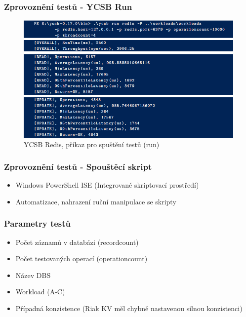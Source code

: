\documentclass{beamer}
\begin{document}
	\begin{frame}
		\frametitle{Zprovoznění testů - YCSB Run}
		\begin{figure}
			\centering
			\includegraphics[scale=0.53]{Figures/ycsb_run_cut.PNG}
			\caption{YCSB Redis, příkaz pro spuštění testů (run)}
		\end{figure}
	\end{frame}
	
	\begin{frame}
		\frametitle{Zprovoznění testů - Spouštěcí skript}
		\begin{itemize}
			\item Windows PowerShell ISE (Integrované skriptovací prostředí)
			\item Automatizace, nahrazení ruční manipulace se skripty
		\end{itemize}
	\end{frame}
	
	\begin{frame}
		\frametitle{Parametry testů}
		\begin{itemize}
			\item Počet záznamů v databázi (recordcount)
			\item Počet testovaných operací (operationcount)
			\item Název DBS
			\item Workload (A-C)
			\item Případná konzistence (Riak KV měl chybně nastavenou silnou konzistenci)
		\end{itemize}
	\end{frame}
	
\end{document}
